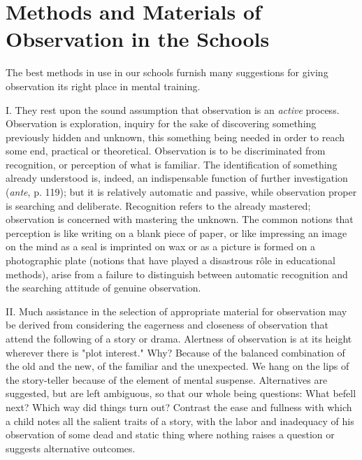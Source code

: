 \documentclass[letterpaper]{book}
\begin{document}
\section{Methods and Materials of Observation in the Schools} The best
methods in use in our schools furnish many suggestions for giving
observation its right place in mental training.


I. They rest upon the sound assumption that observation is an
\emph{active} process. Observation is exploration, inquiry for the sake
of discovering something previously hidden and unknown, this something
being needed in order to reach some end, practical or theoretical.
Observation is to be discriminated from recognition, or perception of
what is familiar. The identification of something already understood is,
indeed, an indispensable function of further investigation (\emph{ante},
p. 119); but it is relatively automatic and passive, while observation
proper is searching and deliberate. Recognition refers to the already
mastered; observation is concerned with mastering the unknown. The
common notions that perception is like writing on a blank piece of
paper, or like impressing an image on the mind as a seal is imprinted on
wax or as a picture is formed on a photographic plate (notions that have
played a disastrous rôle in educational methods), arise from a failure
to distinguish between automatic recognition and the searching attitude
of genuine observation.


II. Much assistance in the selection of appropriate material for
observation may be derived from considering the eagerness and closeness
of observation that attend the following of a story or drama. Alertness
of observation is at its height wherever there is "plot interest." Why?
Because of the balanced combination of the old and the new, of the
familiar and the unexpected. We hang on the lips of the story-teller
because of the element of mental suspense. Alternatives are
suggested,
but are left ambiguous, so that our whole being questions: What befell
next? Which way did things turn out? Contrast the ease and fullness with
which a child notes all the salient traits of a story, with the labor
and inadequacy of his observation of some dead and static thing where
nothing raises a question or suggests alternative outcomes.

\end{document}
